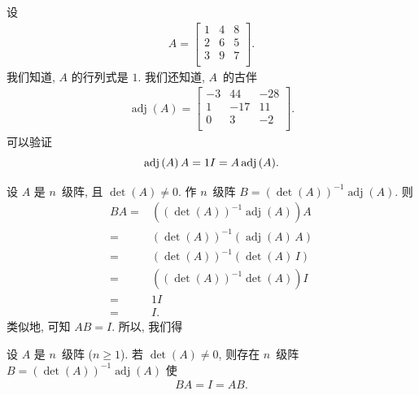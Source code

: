 \documentclass[../libro.tex]{subfiles}
\begin{document}
\begin{example}
    设
    \begin{align*}
        A =
        \begin{bmatrix}
            1 & 4 & 8 \\
            2 & 6 & 5 \\
            3 & 9 & 7 \\
        \end{bmatrix}.
    \end{align*}
    我们知道, \(A\) 的行列式是 \(1\).
    我们还知道, \(A\)~的古伴
    \begin{align*}
        \operatorname{adj} {(A)} =
        \begin{bmatrix}
            -3 & 44  & -28 \\
            1  & -17 & 11  \\
            0  & 3   & -2  \\
        \end{bmatrix}.
    \end{align*}
    可以验证
    \begin{equation*}
        \operatorname{adj} {(A)}\, A
        = 1I
        = A\operatorname{adj} {(A)}.
        \qedhere
    \end{equation*}
\end{example}

设 \(A\) 是 \(n\)~级阵,
且 \(\det {(A)} \neq 0\).
作 \(n\)~级阵
\(B = (\det {(A)})^{-1} \operatorname{adj} {(A)}\).
则
\begin{align*}
    BA
    = {} & ( (\det {(A)})^{-1} \operatorname{adj} {(A)} ) A
    \\
    = {} & (\det {(A)})^{-1} (\operatorname{adj} {(A)}\, A)
    \\
    = {} & (\det {(A)})^{-1} (\det {(A)}\, I)
    \\
    = {} & ( (\det {(A)})^{-1} \det {(A)} ) I
    \\
    = {} & 1I
    \\
    = {} & I.
\end{align*}
类似地, 可知 \(AB = I\).
所以, 我们得

\begin{theorem}
    设 \(A\) 是 \(n\)~级阵 (\(n \geq 1\)).
    若 \(\det {(A)} \neq 0\),
    则存在 \(n\)~级阵
    \(B = (\det {(A)})^{-1} \operatorname{adj} {(A)}\)
    使
    \begin{align*}
        BA = I = AB.
    \end{align*}
\end{theorem}
\end{document}
